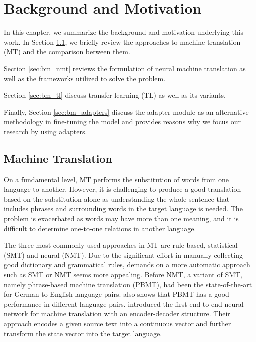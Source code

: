 \chapter{Background and Motivation}

In this chapter, we summarize the background and motivation underlying this work. In Section \ref{sec:bm_smt}, we briefly review the approaches to machine translation (MT) and the comparison between them.

Section \ref{sec:bm_nmt} reviews the formulation of neural machine translation as well as the frameworks utilized to solve the problem.


Section \ref{sec:bm_tl} discuss transfer learning (TL) as well as its variants.

Finally, Section \ref{sec:bm_adapters} discuss the adapter module as an alternative methodology in fine-tuning the model and provides reasons why we focus our research by using adapters.

\section{Machine Translation}
\label{sec:bm_smt}
On a fundamental level, MT performs the substitution of words from one language to another. However, it is challenging to produce a good translation based on the substitution alone as understanding the whole sentence that includes phrases and surrounding words in the target language is needed. The problem is exacerbated as words may have more than one meaning, and it is difficult to determine one-to-one relations in another language.

The three most commonly used approaches in MT are rule-based, statistical (SMT) and neural (NMT). Due to the significant effort in manually collecting good dictionary and grammatical rules, demands on a more automatic approach such as SMT or NMT seems more appealing.
Before NMT, a variant of SMT, namely phrase-based machine translation (PBMT), had been the state-of-the-art for German-to-English language pairs. \cite{bojar2015proceeding} also shows that PBMT has a good performance in different language pairs. \cite{blunsom2013recurrent} introduced the first end-to-end neural network for machine translation with an encoder-decoder structure. Their approach encodes a given source text into a continuous vector and further transform the state vector into the target language.

